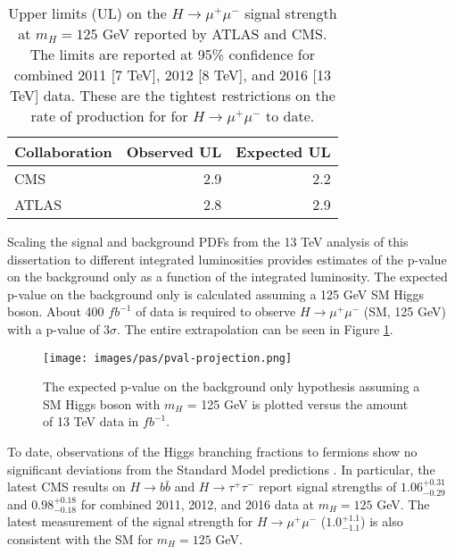 \begin{table}[htb]
  \caption[Upper limits on the rate of production for $H\rightarrow\mu^+\mu^-$ at $m_H=125$ GeV.]{Upper limits (UL) on the $H\rightarrow\mu^+\mu^-$ signal strength at $m_H=125$ GeV reported by ATLAS \cite{atlashmumu2017} and CMS. The limits are reported at 95\% confidence for combined 2011 [7 TeV], 2012 [8 TeV], and 2016 [13 TeV] data. These are the tightest restrictions on the rate of production for for $H\rightarrow\mu^+\mu^-$ to date.}
  \label{tab:cmsatlash2mu}
  \begin{center}
    \begin{tabular}{lrr}
      \hline
      Collaboration  & Observed UL & Expected UL  \\
      \hline
      CMS            &    2.9      & 2.2  \\
      ATLAS          &    2.8      & 2.9  \\
      \hline
    \end{tabular}
  \end{center}
\end{table}

Scaling the signal and background PDFs from the 13 TeV analysis of this dissertation to different integrated luminosities provides estimates of the p-value on the background only as a function of the integrated luminosity. The expected p-value on the background only is calculated assuming a 125 GeV SM Higgs boson. About 400 $fb^{-1}$ of data is required to observe $H\rightarrow\mu^+\mu^-$ (SM, 125 GeV) with a p-value of 3$\sigma$. The entire extrapolation can be seen in Figure \ref{fig:pvalprojection}.

\begin{figure}[h!]
    \centering
    \texttt{[image: images/pas/pval-projection.png]}
    \caption[The expected p-value for a 125 GeV SM Higgs boson versus the amount of 13 TeV data.]
    {The expected p-value on the background only hypothesis assuming a SM Higgs boson with $m_H$ = 125 GeV is plotted versus the amount of 13 TeV data in $fb^{-1}$.}
    \label{fig:pvalprojection}
\end{figure}

To date, observations of the Higgs branching fractions to fermions show no significant deviations from the Standard Model predictions \cite{cmshiggstau2017,cmshiggsbb2017, cmshmumu2017, atlashmumu2017}. In particular, the latest CMS results on $H\rightarrow b\bar{b}$ \cite{cmshiggsbb2017} and $H\rightarrow \tau^+\tau^-$ \cite{cmshiggstau2017} report signal strengths of $1.06^{+0.31}_{-0.29}$ and $0.98^{+0.18}_{-0.18}$ for combined 2011, 2012, and 2016 data at $m_H=125$ GeV. The latest measurement of the signal strength for $H\rightarrow\mu^+\mu^-$ ($1.0^{+1.1}_{-1.1}$) is also consistent with the SM for $m_H=125$ GeV. 

